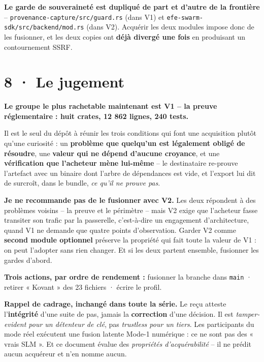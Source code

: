 \documentclass[10pt]{article}
\newcommand{\code}[1]{\texttt{\small #1}}
\begin{document}
\textbf{Le garde de souveraineté est dupliqué de part et d'autre de la frontière} --
\code{provenance-capture/src/guard.rs} (dans V1) et \code{efe-swarm-sdk/src/backend/mod.rs} (dans V2).
Acquérir les deux modules impose donc de les fusionner, et les deux copies ont \textbf{déjà divergé une
fois} en produisant un contournement SSRF.

\section{8 · Le jugement}

\begin{acquis}
\textbf{Le groupe le plus rachetable maintenant est V1 -- la preuve réglementaire : huit crates,
12 862 lignes, 240 tests.}
\end{acquis}

Il est le seul du dépôt à réunir les trois conditions qui font une acquisition plutôt qu'une
curiosité : un \textbf{problème que quelqu'un est légalement obligé de résoudre}, une \textbf{valeur
qui ne dépend d'aucune croyance}, et une \textbf{vérification que l'acheteur mène lui-même} -- le
destinataire re-prouve l'artefact avec un binaire dont l'arbre de dépendances est vide, et l'export lui
dit de surcroît, dans le bundle, \emph{ce qu'il ne prouve pas}.

\textbf{Je ne recommande pas de le fusionner avec V2.} Les deux répondent à des problèmes voisins -- la
preuve et le périmètre -- mais V2 exige que l'acheteur fasse transiter son trafic par la passerelle,
c'est-à-dire un engagement d'architecture, quand V1 ne demande que quatre points d'observation.
Garder V2 comme \textbf{second module optionnel} préserve la propriété qui fait toute la valeur de V1 :
on peut l'adopter sans rien changer. Et si les deux partent ensemble, fusionner les gardes d'abord.

\textbf{Trois actions, par ordre de rendement :} fusionner la branche dans \code{main} · retirer
« Kovant » des 23 fichiers · écrire le profil.

\begin{these}
\small\textbf{Rappel de cadrage, inchangé dans toute la série.} Le reçu atteste l'\textbf{intégrité}
d'une suite de pas, jamais la \textbf{correction} d'une décision. Il est \emph{tamper-evident pour un
détenteur de clé}, pas \emph{trustless pour un tiers}. Les participants du mode réel exécutent une
fusion latente Mode-1 numérique : ce ne sont pas des « vrais SLM ». Et ce document évalue des
\emph{propriétés d'acquérabilité} -- il ne prédit aucun acquéreur et n'en nomme aucun.
\end{these}
\end{document}

